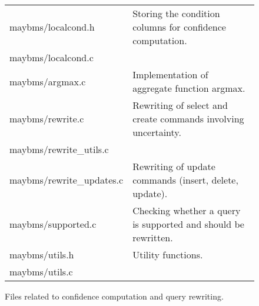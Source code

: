\begin{figure}[ht]
\begin{center}
\begin{tabular}{|l|l|}
maybms/localcond.h       		& Storing the condition columns for confidence computation. \\  
maybms/localcond.c      		&    \\ \hline
maybms/argmax.c      			&    Implementation of aggregate function argmax. \\ \hline
maybms/rewrite.c      			&  Rewriting of select and create commands involving uncertainty. \\ 
maybms/rewrite\_utils.c      	&   \\ \hline
maybms/rewrite\_updates.c      	&    Rewriting of update commands (insert, delete, update). \\ \hline
maybms/supported.c     			&    Checking whether a query is supported and should be rewritten. \\ \hline
maybms/utils.h					& Utility functions. \\	 
maybms/utils.c       			&  \\	\hline                                               
\end{tabular}

\end{center}

\vspace*{-1em}
\caption{ Files related to confidence computation and query rewriting. }
\label{fig:modified-files2}
\end{figure}

\vspace*{-10em}








